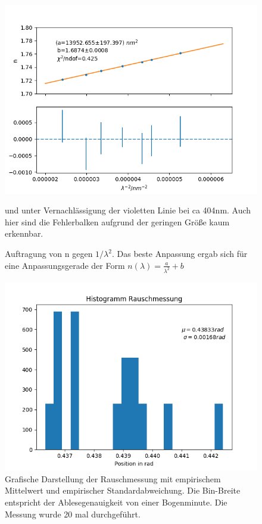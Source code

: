 \documentclass[12pt,a4paper]{article}
\begin{document}
\begin{figure}
\includegraphics[scale=1.0]{Bilder/Regression.png}
\caption{Auftragung von n gegen $1/\lambda^2$. Das beste Anpassung ergab sich für eine Anpassungsgerade der Form $n(\lambda) = \frac{a}{\lambda^2} + b $} und unter Vernachlässigung der violetten Linie bei ca 404nm. Auch hier sind die Fehlerbalken aufgrund der geringen Größe kaum erkennbar.
\label{fig:RegressionDispersion}
\end{figure}


\begin{figure}
\includegraphics[scale=1.0]{Bilder/HistRauschen.png}
\caption{Grafische Darstellung der Rauschmessung mit empirischem Mittelwert und empirischer Standardabweichung. Die Bin-Breite entspricht der Ablesegenauigkeit von einer Bogenminute. Die Messung wurde 20 mal durchgeführt.}
\label{fig:HistRauschen}
\end{figure}
\end{document}
